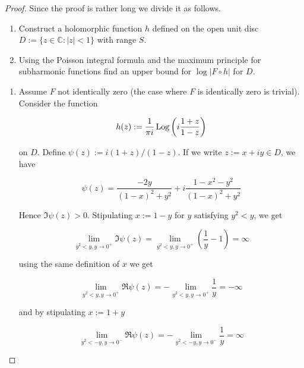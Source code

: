 \begin{proof}
	Since the proof is rather long we divide it as follows.

	\begin{enumerate}[label = \textbf{(\roman*.)}]
		\item Construct a holomorphic function $h$ defined on the open unit disc $D := \{z \in \mathbb{C} : \vert z \vert < 1\}$ with range $S$.
		\item Using the Poisson integral formula and the maximum principle for subharmonic functions find an upper bound for $\log\vert F \circ h\vert$ for $D$.
	\end{enumerate}

	\begin{enumerate}[label = \textbf{(\roman*.)}]
		\item Assume $F$ not identically zero (the case where $F$ is identically zero is trivial). Consider the function 

	\begin{equation}
		h(z) := \frac{1}{\pi i}\operatorname{Log}\left( i\frac{1 + z}{1 - z} \right)
	\end{equation}

	on $D$. Define $\psi(z) := i(1 + z)/(1 - z)$. If we write $z := x + iy \in D$, we have 

	\begin{equation}
		\psi(z) = \frac{-2y}{(1 - x)^2 + y^2} + i \frac{1 - x^2 - y^2}{(1 - x)^2 + y^2}
	\end{equation}

	Hence $\Im \psi(z) > 0$. Stipulating $x := 1 - y$ for $y$ satisfying $y^2 < y$, we get

	\begin{equation}
		\lim\limits_{y^2 < y, y \rightarrow 0^+} \Im \psi(z) = \lim\limits_{y^2 < y, y \rightarrow 0^+} \left( \frac{1}{y} - 1 \right) = \infty
	\end{equation}

	using the same definition of $x$ we get

	\begin{equation}
		\lim\limits_{y^2 < y, y \rightarrow 0^+} \Re \psi(z) = -\lim\limits_{y^2 < y, y \rightarrow 0^+} \frac{1}{y} = -\infty
	\end{equation}

	and by stipulating $x := 1 + y$

	\begin{equation}
		\lim\limits_{y^2 < -y, y \rightarrow 0^-} \Re \psi(z) = -\lim\limits_{y^2 < -y, y \rightarrow 0^-} \frac{1}{y} = \infty	
	\end{equation}



\end{enumerate}
\end{proof}
